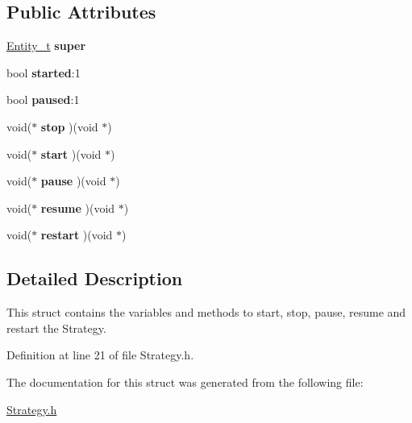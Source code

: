 \subsection*{Public Attributes}
\begin{DoxyCompactItemize}
\item 
\hypertarget{structStrategy__t_a63766466eabf086d6e7085d92b7a7c6a}{
\hyperlink{structEntity__t}{Entity\_\-t} {\bfseries super}}
\label{structStrategy__t_a63766466eabf086d6e7085d92b7a7c6a}

\item 
\hypertarget{structStrategy__t_a39f4dd341665db35739e1dbbf4e4575d}{
bool {\bfseries started}:1}
\label{structStrategy__t_a39f4dd341665db35739e1dbbf4e4575d}

\item 
\hypertarget{structStrategy__t_a664e46b39438d57554a3968a7c8d4bd8}{
bool {\bfseries paused}:1}
\label{structStrategy__t_a664e46b39438d57554a3968a7c8d4bd8}

\item 
\hypertarget{structStrategy__t_a38782579e4d43a54c23f485875ebfa0c}{
void($\ast$ {\bfseries stop} )(void $\ast$)}
\label{structStrategy__t_a38782579e4d43a54c23f485875ebfa0c}

\item 
\hypertarget{structStrategy__t_a5506d6603733890574c07046dc3ff9c0}{
void($\ast$ {\bfseries start} )(void $\ast$)}
\label{structStrategy__t_a5506d6603733890574c07046dc3ff9c0}

\item 
\hypertarget{structStrategy__t_a6aeaac77604a7b3b860b481979d88606}{
void($\ast$ {\bfseries pause} )(void $\ast$)}
\label{structStrategy__t_a6aeaac77604a7b3b860b481979d88606}

\item 
\hypertarget{structStrategy__t_a8d731f8c2046fa3fd37855a3455ec328}{
void($\ast$ {\bfseries resume} )(void $\ast$)}
\label{structStrategy__t_a8d731f8c2046fa3fd37855a3455ec328}

\item 
\hypertarget{structStrategy__t_ad3d024bbe533b3442b3a418d1c063ef7}{
void($\ast$ {\bfseries restart} )(void $\ast$)}
\label{structStrategy__t_ad3d024bbe533b3442b3a418d1c063ef7}

\end{DoxyCompactItemize}


\subsection{Detailed Description}
This struct contains the variables and methods to start, stop, pause, resume and restart the Strategy. 

Definition at line 21 of file Strategy.h.



The documentation for this struct was generated from the following file:\begin{DoxyCompactItemize}
\item 
\hyperlink{Strategy_8h}{Strategy.h}\end{DoxyCompactItemize}
